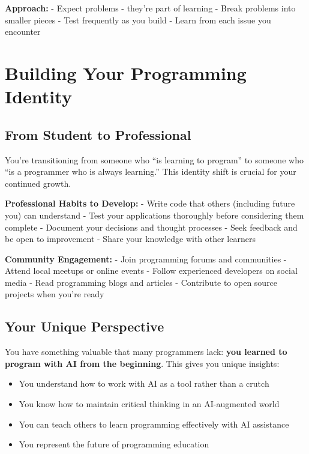 \documentclass[
  letterpaper,
  DIV=11,
  numbers=noendperiod,
  oneside]{scrreprt}
\providecommand{\tightlist}{%
  \setlength{\itemsep}{0pt}\setlength{\parskip}{0pt}}\usepackage{longtable,booktabs,array}
\begin{document}
\textbf{Approach:} - Expect problems - they're part of learning - Break
problems into smaller pieces - Test frequently as you build - Learn from
each issue you encounter

\section{Building Your Programming
Identity}\label{building-your-programming-identity}

\subsection{From Student to
Professional}\label{from-student-to-professional}

You're transitioning from someone who ``is learning to program'' to
someone who ``is a programmer who is always learning.'' This identity
shift is crucial for your continued growth.

\textbf{Professional Habits to Develop:} - Write code that others
(including future you) can understand - Test your applications
thoroughly before considering them complete - Document your decisions
and thought processes - Seek feedback and be open to improvement - Share
your knowledge with other learners

\textbf{Community Engagement:} - Join programming forums and communities
- Attend local meetups or online events - Follow experienced developers
on social media - Read programming blogs and articles - Contribute to
open source projects when you're ready

\subsection{Your Unique Perspective}\label{your-unique-perspective}

You have something valuable that many programmers lack: \textbf{you
learned to program with AI from the beginning}. This gives you unique
insights:

\begin{itemize}
\tightlist
\item
  You understand how to work with AI as a tool rather than a crutch
\item
  You know how to maintain critical thinking in an AI-augmented world
\item
  You can teach others to learn programming effectively with AI
  assistance
\item
  You represent the future of programming education
\end{itemize}
\end{document}
